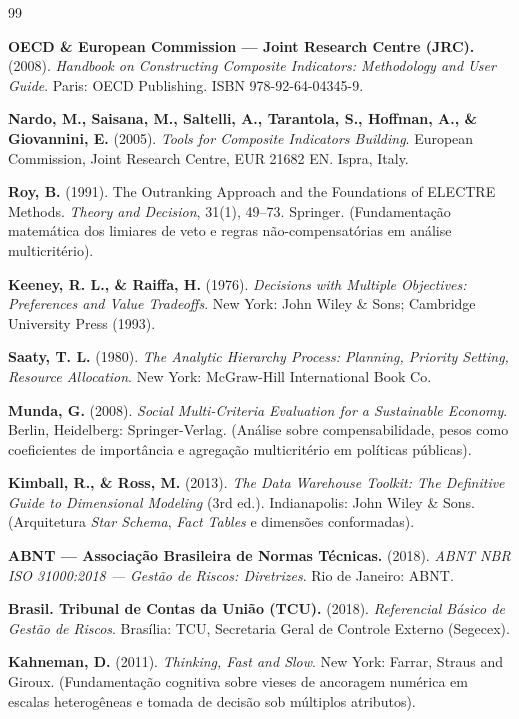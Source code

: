 \documentclass[9pt,a4paper]{extarticle}
\begin{document}
\begin{thebibliography}{99}
\footnotesize

\textbf{OECD \& European Commission --- Joint Research Centre (JRC).} (2008). \emph{Handbook on Constructing Composite Indicators: Methodology and User Guide}. Paris: OECD Publishing. ISBN 978-92-64-04345-9.

\textbf{Nardo, M., Saisana, M., Saltelli, A., Tarantola, S., Hoffman, A., \& Giovannini, E.} (2005). \emph{Tools for Composite Indicators Building}. European Commission, Joint Research Centre, EUR 21682 EN. Ispra, Italy.

\textbf{Roy, B.} (1991). The Outranking Approach and the Foundations of ELECTRE Methods. \emph{Theory and Decision}, 31(1), 49--73. Springer. (Fundamentação matemática dos limiares de veto e regras não-compensatórias em análise multicritério).

\textbf{Keeney, R. L., \& Raiffa, H.} (1976). \emph{Decisions with Multiple Objectives: Preferences and Value Tradeoffs}. New York: John Wiley \& Sons; Cambridge University Press (1993).

\textbf{Saaty, T. L.} (1980). \emph{The Analytic Hierarchy Process: Planning, Priority Setting, Resource Allocation}. New York: McGraw-Hill International Book Co.

\textbf{Munda, G.} (2008). \emph{Social Multi-Criteria Evaluation for a Sustainable Economy}. Berlin, Heidelberg: Springer-Verlag. (Análise sobre compensabilidade, pesos como coeficientes de importância e agregação multicritério em políticas públicas).

\textbf{Kimball, R., \& Ross, M.} (2013). \emph{The Data Warehouse Toolkit: The Definitive Guide to Dimensional Modeling} (3rd ed.). Indianapolis: John Wiley \& Sons. (Arquitetura \emph{Star Schema}, \emph{Fact Tables} e dimensões conformadas).

\textbf{ABNT --- Associação Brasileira de Normas Técnicas.} (2018). \emph{ABNT NBR ISO 31000:2018 --- Gestão de Riscos: Diretrizes}. Rio de Janeiro: ABNT.

\textbf{Brasil. Tribunal de Contas da União (TCU).} (2018). \emph{Referencial Básico de Gestão de Riscos}. Brasília: TCU, Secretaria Geral de Controle Externo (Segecex).

\textbf{Kahneman, D.} (2011). \emph{Thinking, Fast and Slow}. New York: Farrar, Straus and Giroux. (Fundamentação cognitiva sobre vieses de ancoragem numérica em escalas heterogêneas e tomada de decisão sob múltiplos atributos).

\end{thebibliography}
\end{document}
